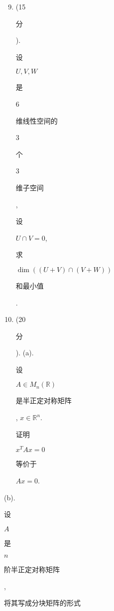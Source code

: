 \documentclass[10pt]{article}
\begin{document}
\begin{enumerate}
  \setcounter{enumi}{8}
  \item (15 \begin{CJK}{UTF8}{mj}分\end{CJK}). \begin{CJK}{UTF8}{mj}设\end{CJK} $U, V, W$ \begin{CJK}{UTF8}{mj}是\end{CJK} 6 \begin{CJK}{UTF8}{mj}维线性空间的\end{CJK} 3 \begin{CJK}{UTF8}{mj}个\end{CJK} 3 \begin{CJK}{UTF8}{mj}维子空间\end{CJK}, \begin{CJK}{UTF8}{mj}设\end{CJK} $U \cap V=0$, \begin{CJK}{UTF8}{mj}求\end{CJK} $\operatorname{dim}((U+V) \cap(V+W))$ \begin{CJK}{UTF8}{mj}和最小值\end{CJK}.

  \item (20 \begin{CJK}{UTF8}{mj}分\end{CJK}). (a). \begin{CJK}{UTF8}{mj}设\end{CJK} $A \in M_{n}(\mathbb{R})$ \begin{CJK}{UTF8}{mj}是半正定对称矩阵\end{CJK}, $x \in \mathbb{R}^{n}$. \begin{CJK}{UTF8}{mj}证明\end{CJK} $x^{T} A x=0$ \begin{CJK}{UTF8}{mj}等价于\end{CJK} $A x=0$.

\end{enumerate}
(b). \begin{CJK}{UTF8}{mj}设\end{CJK} $A$ \begin{CJK}{UTF8}{mj}是\end{CJK} $n$ \begin{CJK}{UTF8}{mj}阶半正定对称矩阵\end{CJK}, \begin{CJK}{UTF8}{mj}将其写成分块矩阵的形式\end{CJK}
\end{document}
